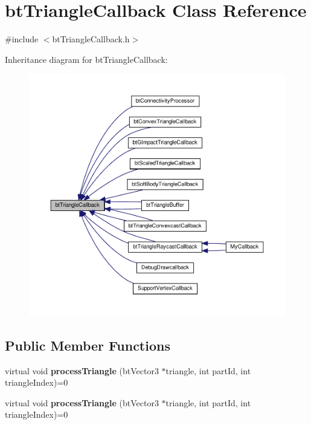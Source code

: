 \hypertarget{classbtTriangleCallback}{}\section{bt\+Triangle\+Callback Class Reference}
\label{classbtTriangleCallback}


{\ttfamily \#include $<$bt\+Triangle\+Callback.\+h$>$}



Inheritance diagram for bt\+Triangle\+Callback\+:
\nopagebreak
\begin{figure}[H]
\begin{center}
\leavevmode
\includegraphics[width=350pt]{classbtTriangleCallback__inherit__graph}
\end{center}
\end{figure}
\subsection*{Public Member Functions}
\begin{DoxyCompactItemize}
\item 
\mbox{\label{classbtTriangleCallback_a3850755f2c1fd71c4ca5877db1e6f891}} 
virtual void {\bfseries process\+Triangle} (bt\+Vector3 $\ast$triangle, int part\+Id, int triangle\+Index)=0
\item 
\mbox{\label{classbtTriangleCallback_a3850755f2c1fd71c4ca5877db1e6f891}} 
virtual void {\bfseries process\+Triangle} (bt\+Vector3 $\ast$triangle, int part\+Id, int triangle\+Index)=0
\end{DoxyCompactItemize}


